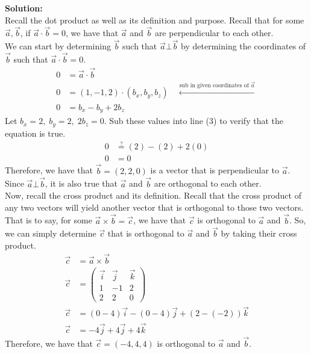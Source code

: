 \documentclass[12pt]{book}
\begin{document}
\begin{enumerate}
\textbf{Solution:}\\
Recall the dot product as well as its definition and purpose. Recall that for some $\vec{a}, \vec{b}$, if $\vec{a} \cdot \vec{b} = 0$, we have that $\vec{a}$ and $\vec{b}$ are perpendicular to each other.\\

We can start by determining $\vec{b}$ such that $\vec{a} \bot \vec{b}$ by determining the coordinates of $\vec{b}$ such that $\vec{a} \cdot \vec{b} = 0$.
\begin{align}
    0 &= \vec{a} \cdot \vec{b} \\
    0 &= (1,-1,2) \cdot (b_x, b_y, b_z) \quad \xleftarrow[]{\text{sub in given coordinates of } \vec{a}} \\
    0 &= b_x-b_y+2b_z
\end{align}
Let $b_x = 2,\; b_y = 2,\; 2b_z = 0$. Sub these values into line (3) to verify that the equation is true.
\begin{align}
    0 &\stackrel{?}{=} (2)-(2)+2(0) \\
    0 &= 0
\end{align}
Therefore, we have that $\vec{b} = (2,2,0)$ is a vector that is perpendicular to $\vec{a}$. Since $\vec{a} \bot \vec{b}$, it is also true that $\vec{a}$ and $\vec{b}$ are orthogonal to each other.\\

Now, recall the cross product and its definition. Recall that the cross product of any two vectors will yield another vector that is orthogonal to those two vectors. That is to say, for some $\vec{a} \times \vec{b} = \vec{c}$, we have that $\vec{c}$ is orthogonal to $\vec{a}$ and $\vec{b}$. So, we can simply determine $\vec{c}$ that is orthogonal to $\vec{a}$ and $\vec{b}$ by taking their cross product.
\begin{align}
    \vec{c} &= \vec{a} \times \vec{b} \\
    \vec{c} &= \begin{pmatrix}
                  \vec{i} & \vec{j} & \vec{k} \\
                  1 & -1 & 2 \\
                  2 & 2 & 0
               \end{pmatrix}\\
    \vec{c} &= (0-4)\vec{i} - (0-4)\vec{j} + (2-(-2))\vec{k} \\
    \vec{c} &= -4\vec{j} + 4\vec{j} + 4\vec{k}
\end{align}
Therefore, we have that $\vec{c} = (-4,4,4)$ is orthogonal to $\vec{a}$ and $\vec{b}$.\\


\end{enumerate}
\end{document}
